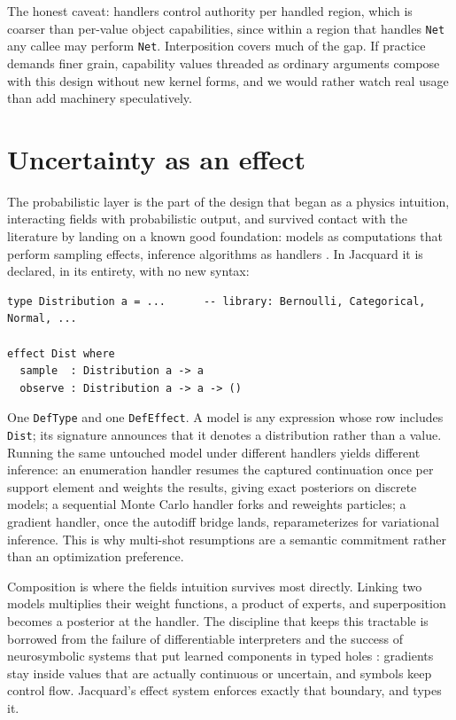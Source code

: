 \documentclass[11pt]{article}
\newcommand{\jacquard}{Jacquard}
\begin{document}
The honest caveat: handlers control authority per handled region, which is coarser than per-value object capabilities, since within a region that handles \texttt{Net} any callee may perform \texttt{Net}. Interposition covers much of the gap. If practice demands finer grain, capability values threaded as ordinary arguments compose with this design without new kernel forms, and we would rather watch real usage than add machinery speculatively.

\section{Uncertainty as an effect}
\label{sec:dist}

The probabilistic layer is the part of the design that began as a physics intuition, interacting fields with probabilistic output, and survived contact with the literature by landing on a known good foundation: models as computations that perform sampling effects, inference algorithms as handlers \cite{scibior2015, bingham2019}. In \jacquard{} it is declared, in its entirety, with no new syntax:

\begin{lstlisting}
type Distribution a = ...      -- library: Bernoulli, Categorical, Normal, ...

effect Dist where
  sample  : Distribution a -> a
  observe : Distribution a -> a -> ()
\end{lstlisting}

One \texttt{DefType} and one \texttt{DefEffect}. A model is any expression whose row includes \texttt{Dist}; its signature announces that it denotes a distribution rather than a value. Running the same untouched model under different handlers yields different inference: an enumeration handler resumes the captured continuation once per support element and weights the results, giving exact posteriors on discrete models; a sequential Monte Carlo handler forks and reweights particles; a gradient handler, once the autodiff bridge lands, reparameterizes for variational inference. This is why multi-shot resumptions are a semantic commitment rather than an optimization preference.

Composition is where the fields intuition survives most directly. Linking two models multiplies their weight functions, a product of experts, and superposition becomes a posterior at the handler. The discipline that keeps this tractable is borrowed from the failure of differentiable interpreters \cite{gaunt2016} and the success of neurosymbolic systems that put learned components in typed holes \cite{li2023, manhaeve2018}: gradients stay inside values that are actually continuous or uncertain, and symbols keep control flow. \jacquard's effect system enforces exactly that boundary, and types it.
\end{document}

